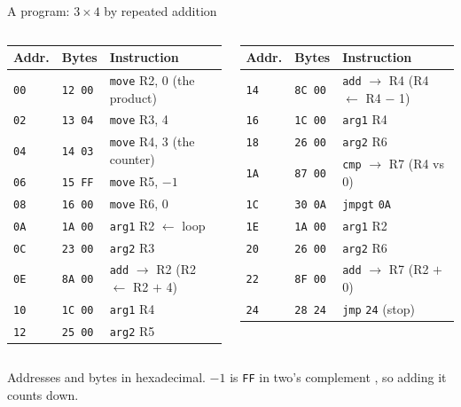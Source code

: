 \documentclass[10pt]{wosm-slides}
\begin{document}
\begin{frame}{A program: $3 \times 4$ by repeated addition}
  \begin{columns}[T, totalwidth=\textwidth]
      \footnotesize
      \begin{tabular}{@{}lll@{}}
        \toprule
        Addr. & Bytes & Instruction \\
        \midrule
        \texttt{00} & \texttt{12 00} & \texttt{move} R2, 0 \quad (the product) \\
        \texttt{02} & \texttt{13 04} & \texttt{move} R3, 4 \\
        \texttt{04} & \texttt{14 03} & \texttt{move} R4, 3 \quad (the counter) \\
        \texttt{06} & \texttt{15 FF} & \texttt{move} R5, $-1$ \\
        \texttt{08} & \texttt{16 00} & \texttt{move} R6, 0 \\
        \texttt{0A} & \texttt{1A 00} & \texttt{arg1} R2 \quad $\leftarrow$ loop \\
        \texttt{0C} & \texttt{23 00} & \texttt{arg2} R3 \\
        \texttt{0E} & \texttt{8A 00} & \texttt{add} $\to$ R2 \quad (R2 $\leftarrow$ R2 $+$ 4) \\
        \texttt{10} & \texttt{1C 00} & \texttt{arg1} R4 \\
        \texttt{12} & \texttt{25 00} & \texttt{arg2} R5 \\
        \bottomrule
      \end{tabular}
      \footnotesize
      \begin{tabular}{@{}lll@{}}
        \toprule
        Addr. & Bytes & Instruction \\
        \midrule
        \texttt{14} & \texttt{8C 00} & \texttt{add} $\to$ R4 \quad (R4 $\leftarrow$ R4 $-$ 1) \\
        \texttt{16} & \texttt{1C 00} & \texttt{arg1} R4 \\
        \texttt{18} & \texttt{26 00} & \texttt{arg2} R6 \\
        \texttt{1A} & \texttt{87 00} & \texttt{cmp} $\to$ R7 \quad (R4 vs 0) \\
        \texttt{1C} & \texttt{30 0A} & \texttt{jmpgt} \texttt{0A} \\
        \texttt{1E} & \texttt{1A 00} & \texttt{arg1} R2 \\
        \texttt{20} & \texttt{26 00} & \texttt{arg2} R6 \\
        \texttt{22} & \texttt{8F 00} & \texttt{add} $\to$ R7 \quad (R2 $+$ 0) \\
        \texttt{24} & \texttt{28 24} & \texttt{jmp} \texttt{24} \quad (stop) \\
        \bottomrule
      \end{tabular}
  \end{columns}

  \medskip
  \small Addresses and bytes in hexadecimal. $-1$ is \texttt{FF} in two's complement
  , so adding it counts down.
\end{frame}
\end{document}
